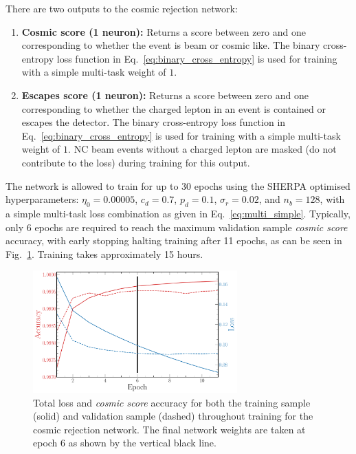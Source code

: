There are two outputs to the cosmic rejection network:
\begin{enumerate}
    \item \textbf{Cosmic score (1 neuron):} Returns a score between zero and one corresponding to
          whether the event is beam or cosmic like. The binary cross-entropy loss function in
          Eq.~\ref{eq:binary_cross_entropy} is used for training with a simple multi-task weight
          of $1$.
    \item \textbf{Escapes score (1 neuron):} Returns a score between zero and one corresponding to
          whether the charged lepton in an event is contained or escapes the detector. The binary
          cross-entropy loss function in Eq.~\ref{eq:binary_cross_entropy} is used for training
          with a simple multi-task weight of $1$. NC beam events without a charged lepton are
          masked (do not contribute to the loss) during training for this output.
\end{enumerate}

The network is allowed to train for up to 30 epochs using the SHERPA optimised hyperparameters:
$\eta_{0}=0.00005$, $c_{d}=0.7$, $p_{d}=0.1$, $\sigma_{r}=0.02$, and $n_{b}=128$, with a simple
multi-task loss combination as given in Eq.~\ref{eq:multi_simple}. Typically, only 6 epochs are
required to reach the maximum validation sample \emph{cosmic score} accuracy, with early stopping
halting training after 11 epochs, as can be seen in Fig.~\ref{fig:final_cosmic_history}. Training
takes approximately 15 hours.

\begin{figure} %
    \includegraphics[width=0.7\textwidth]{diagrams/6-cvn/chipsnet/final_cosmic_history.pdf}
    \caption[Loss and accuracy throughout training for the cosmic rejection network.]
    {Total loss and \emph{cosmic score} accuracy for both the training sample (solid) and
        validation sample (dashed) throughout training for the cosmic rejection network. The final
        network weights are taken at epoch 6 as shown by the vertical black line.}
    \label{fig:final_cosmic_history}
\end{figure}

